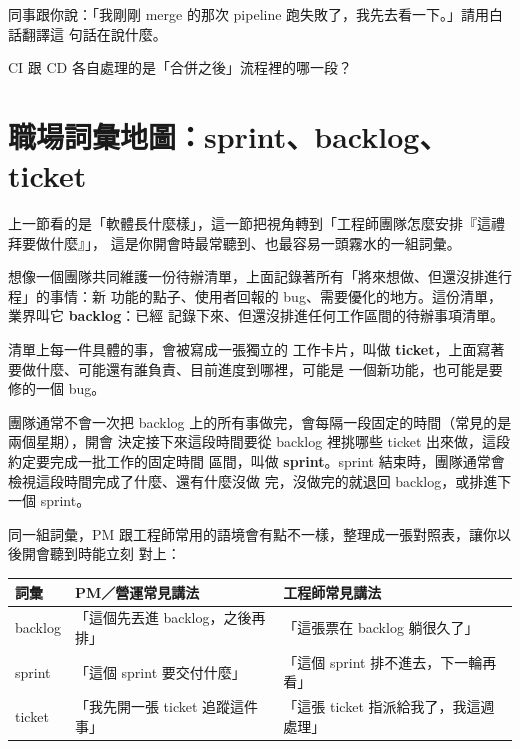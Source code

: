 
\begin{drills}[label=drills:cicd]
\item 同事跟你說：「我剛剛 merge 的那次 pipeline 跑失敗了，我先去看一下。」請用白話翻譯這
句話在說什麼。
\item CI 跟 CD 各自處理的是「合併之後」流程裡的哪一段？
\end{drills}

\section{職場詞彙地圖：sprint、backlog、ticket}
\label{sec:workplace-vocab}

上一節看的是「軟體長什麼樣」，這一節把視角轉到「工程師團隊怎麼安排『這禮拜要做什麼』」，
這是你開會時最常聽到、也最容易一頭霧水的一組詞彙。

想像一個團隊共同維護一份待辦清單，上面記錄著所有「將來想做、但還沒排進行程」的事情：新
功能的點子、使用者回報的 bug、需要優化的地方。這份清單，業界叫它 \textbf{backlog}：已經
記錄下來、但還沒排進任何工作區間的待辦事項清單。

清單上每一件具體的事，會被寫成一張獨立的
工作卡片，叫做 \textbf{ticket}，上面寫著要做什麼、可能還有誰負責、目前進度到哪裡，可能是
一個新功能，也可能是要修的一個 bug。

團隊通常不會一次把 backlog 上的所有事做完，會每隔一段固定的時間（常見的是兩個星期），開會
決定接下來這段時間要從 backlog 裡挑哪些 ticket 出來做，這段約定要完成一批工作的固定時間
區間，叫做 \textbf{sprint}。sprint 結束時，團隊通常會檢視這段時間完成了什麼、還有什麼沒做
完，沒做完的就退回 backlog，或排進下一個 sprint。

同一組詞彙，PM 跟工程師常用的語境會有點不一樣，整理成一張對照表，讓你以後開會聽到時能立刻
對上：

\begin{center}
\begin{tabular}{@{}lp{4cm}p{4cm}@{}}
\toprule
詞彙 & PM／營運常見講法 & 工程師常見講法 \\
\midrule
backlog & 「這個先丟進 backlog，之後再排」 & 「這張票在 backlog 躺很久了」 \\
sprint & 「這個 sprint 要交付什麼」 & 「這個 sprint 排不進去，下一輪再看」 \\
ticket & 「我先開一張 ticket 追蹤這件事」 & 「這張 ticket 指派給我了，我這週處理」 \\
\bottomrule
\end{tabular}
\end{center}

